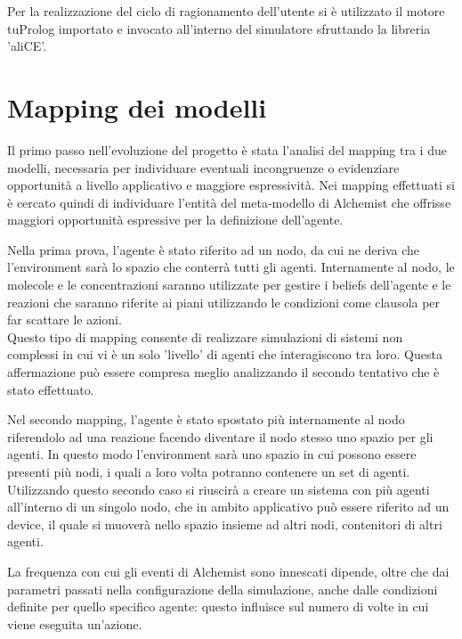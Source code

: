 \documentclass[12pt,a4paper,openright,twoside]{report}
\begin{document}
Per la realizzazione del ciclo di ragionamento dell'utente si \`e utilizzato il motore tuProlog importato e invocato all'interno del simulatore sfruttando la libreria 'aliCE'.

\section{Mapping dei modelli}
Il primo passo nell'evoluzione del progetto \`e stata l'analisi del mapping tra i due modelli, necessaria per individuare eventuali incongruenze o evidenziare opportunit\`a a livello applicativo e maggiore espressivit\`a.
Nei mapping effettuati si \`e cercato quindi di individuare l'entit\`a del meta-modello di Alchemist che offrisse maggiori opportunit\`a espressive per la definizione dell'agente.

Nella prima prova, l'agente \`e stato riferito ad un nodo, da cui ne deriva che l'environment sar\`a lo spazio che conterr\`a tutti gli agenti. Internamente al nodo, le molecole e le concentrazioni saranno utilizzate per gestire i beliefs dell'agente e le reazioni che saranno riferite ai piani utilizzando le condizioni come clausola per far scattare le azioni.
\\
Questo tipo di mapping consente di realizzare simulazioni di sistemi non complessi in cui vi \`e un solo 'livello' di agenti che interagiscono tra loro. Questa affermazione pu\`o essere compresa meglio analizzando il secondo tentativo che \`e stato effettuato.

Nel secondo mapping, l'agente \`e stato spostato pi\`u internamente al nodo riferendolo ad una reazione facendo diventare il nodo stesso uno spazio per gli agenti. In questo modo l'environment sar\`a uno spazio in cui possono essere presenti pi\`u nodi, i quali a loro volta potranno contenere un set di agenti.
\\
Utilizzando questo secondo caso si riuscir\`a a creare un sistema con pi\`u agenti all'interno di un singolo nodo, che in ambito applicativo pu\`o essere riferito ad un device, il quale si muover\`a nello spazio insieme ad altri nodi, contenitori di altri agenti.

La frequenza con cui gli eventi di Alchemist sono innescati dipende, oltre che dai parametri passati nella configurazione della simulazione, anche dalle condizioni definite per quello specifico agente: questo influisce sul numero di volte in cui viene eseguita un'azione.
\end{document}
